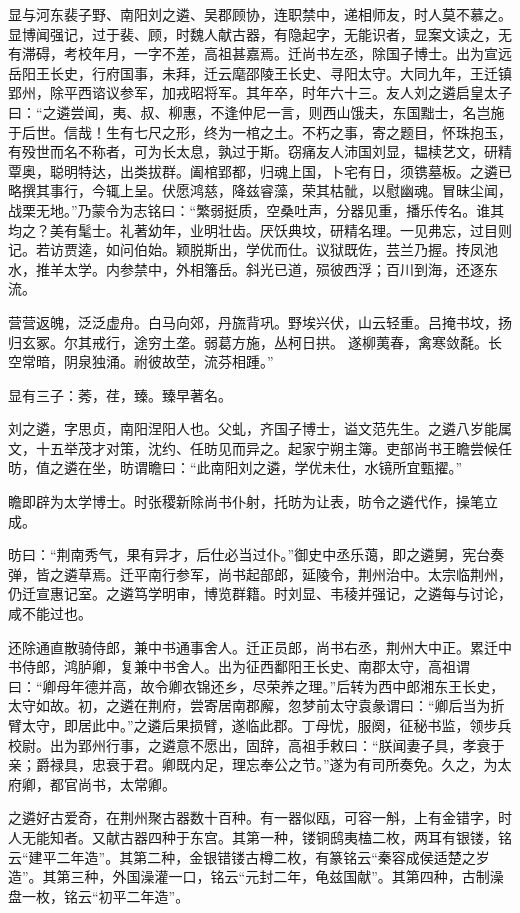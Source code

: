 \documentclass[12pt,UTF8]{ctexbook}
\begin{document}
显与河东裴子野、南阳刘之遴、吴郡顾协，连职禁中，递相师友，时人莫不慕之。显博闻强记，过于裴、顾，时魏人献古器，有隐起字，无能识者，显案文读之，无有滞碍，考校年月，一字不差，高祖甚嘉焉。迁尚书左丞，除国子博士。出为宣远岳阳王长史，行府国事，未拜，迁云麾邵陵王长史、寻阳太守。大同九年，王迁镇郢州，除平西谘议参军，加戎昭将军。其年卒，时年六十三。友人刘之遴启皇太子曰：“之遴尝闻，夷、叔、柳惠，不逢仲尼一言，则西山饿夫，东国黜士，名岂施于后世。信哉！生有七尺之形，终为一棺之土。不朽之事，寄之题目，怀珠抱玉，有殁世而名不称者，可为长太息，孰过于斯。窃痛友人沛国刘显，韫椟艺文，研精覃奥，聪明特达，出类拔群。阖棺郢都，归魂上国，卜宅有日，须镌墓板。之遴已略撰其事行，今辄上呈。伏愿鸿慈，降兹睿藻，荣其枯骴，以慰幽魂。冒昧尘闻，战栗无地。”乃蒙令为志铭曰：“繁弱挺质，空桑吐声，分器见重，播乐传名。谁其均之？美有髦士。礼著幼年，业明壮齿。厌饫典坟，研精名理。一见弗忘，过目则记。若访贾逵，如问伯始。颖脱斯出，学优而仕。议狱既佐，芸兰乃握。抟凤池水，推羊太学。内参禁中，外相籓岳。斜光已道，殒彼西浮；百川到海，还逐东流。

营营返魄，泛泛虚舟。白马向郊，丹旒背巩。野埃兴伏，山云轻重。吕掩书坟，扬归玄冢。尔其戒行，途穷土垄。弱葛方施，丛柯日拱。遂柳荑春，禽寒敛氄。长空常暗，阴泉独涌。祔彼故茔，流芬相踵。”

显有三子：莠，荏，臻。臻早著名。

刘之遴，字思贞，南阳涅阳人也。父虬，齐国子博士，谥文范先生。之遴八岁能属文，十五举茂才对策，沈约、任昉见而异之。起家宁朔主簿。吏部尚书王瞻尝候任昉，值之遴在坐，昉谓瞻曰：“此南阳刘之遴，学优未仕，水镜所宜甄擢。”

瞻即辟为太学博士。时张稷新除尚书仆射，托昉为让表，昉令之遴代作，操笔立成。

昉曰：“荆南秀气，果有异才，后仕必当过仆。”御史中丞乐蔼，即之遴舅，宪台奏弹，皆之遴草焉。迁平南行参军，尚书起部郎，延陵令，荆州治中。太宗临荆州，仍迁宣惠记室。之遴笃学明审，博览群籍。时刘显、韦稜并强记，之遴每与讨论，咸不能过也。

还除通直散骑侍郎，兼中书通事舍人。迁正员郎，尚书右丞，荆州大中正。累迁中书侍郎，鸿胪卿，复兼中书舍人。出为征西鄱阳王长史、南郡太守，高祖谓曰：“卿母年德并高，故令卿衣锦还乡，尽荣养之理。”后转为西中郎湘东王长史，太守如故。初，之遴在荆府，尝寄居南郡廨，忽梦前太守袁彖谓曰：“卿后当为折臂太守，即居此中。”之遴后果损臂，遂临此郡。丁母忧，服阕，征秘书监，领步兵校尉。出为郢州行事，之遴意不愿出，固辞，高祖手敕曰：“朕闻妻子具，孝衰于亲；爵禄具，忠衰于君。卿既内足，理忘奉公之节。”遂为有司所奏免。久之，为太府卿，都官尚书，太常卿。

之遴好古爱奇，在荆州聚古器数十百种。有一器似瓯，可容一斛，上有金错字，时人无能知者。又献古器四种于东宫。其第一种，镂铜鸱夷榼二枚，两耳有银镂，铭云“建平二年造”。其第二种，金银错镂古樽二枚，有篆铭云“秦容成侯适楚之岁造”。其第三种，外国澡灌一口，铭云“元封二年，龟兹国献”。其第四种，古制澡盘一枚，铭云“初平二年造”。
\end{document}
